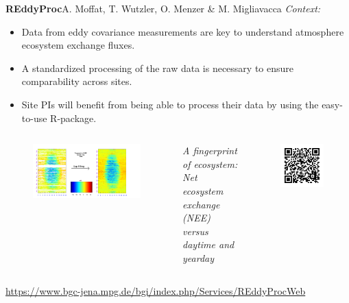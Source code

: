 
  {\vspace{.2cm}\textbf{REddyProc}\hfill\normalsize{A. Moffat, T. Wutzler, O. Menzer \& M. Migliavacca}}
\alert{\textit{Context:}}

\begin{itemize}
    \item Data from eddy covariance measurements are key to understand atmosphere ecosystem exchange fluxes.
    \item A standardized processing of the raw data is necessary to ensure comparability across sites.
    \item Site PIs will benefit from being able to process their data by using the easy-to-use R-package.
\end{itemize}
 

\begin{columns}
    \begin{figure}[tb]
    \begin{center}
        \includegraphics[width=.95\textwidth]{images/content/DE-Tha_1998_FP_NEE_ffc}
    \end{center}
    \end{figure}
\small{\textit{A fingerprint of ecosystem: Net ecosystem exchange (NEE) versus daytime and yearday}}
\vspace{4cm}
	\begin{figure}[tb]
		\includegraphics[width=.6\textwidth]{images/qrcodeREddyProc.jpg}
	\end{figure}
\end{columns}
\vspace{1cm}
\hfill\large{\url{https://www.bgc-jena.mpg.de/bgi/index.php/Services/REddyProcWeb}}

